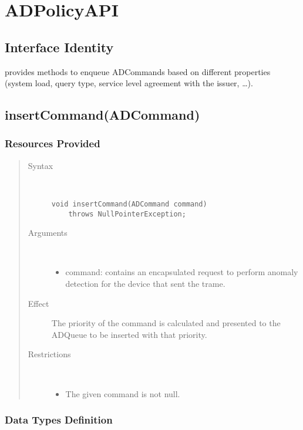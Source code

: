 \section{ADPolicyAPI}

\subsection{Interface Identity}

\npar {} provides methods to enqueue
ADCommands based on different properties (system load, query type,
service level agreement with the issuer, \ldots).

\subsection{insertCommand(ADCommand)}

\subsubsection{Resources Provided}

\begin{quote}
	\begin{description}
		\item[Syntax] \ 
		\begin{verbatim}
void insertCommand(ADCommand command) 
    throws NullPointerException;
		\end{verbatim}
		\item[Arguments] \
		\begin{itemize}
			\item command: contains an encapsulated request to perform anomaly detection
			for the device that sent the trame.
		\end{itemize}
		\item[Effect] The priority of the command is calculated and presented to the
		ADQueue to be inserted with that priority.
		\item[Restrictions] \ 
		\begin{itemize}
			\item The given command is not null.
		\end{itemize}
	\end{description} 
\end{quote}

\subsubsection{Data Types Definition}

